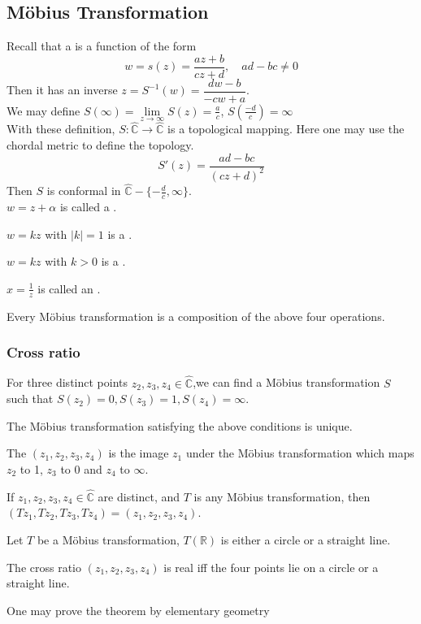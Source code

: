 \subsection{M{\"o}bius Transformation}
Recall that a  is a function of the form
\[w=s(z)=\frac{az+b}{cz+d},\quad ad-bc\not=0\]
Then it has an inverse  $ z=S^{-1}(w)=\dfrac{dw-b}{-cw+a} $.\\
We may define  $ S(\infty)=\lim\limits_{z\to \infty}S(z)=\frac{a }{c} $, $ S(\frac{-d }{c})=\infty $ \\
With these definition,  $ S:\hat{\mathbb{C}}\rightarrow\hat{\mathbb{C}} $ is a topological mapping. Here one may use the chordal metric to define the topology.\\
\[S'(z)=\frac{ad-bc}{(cz+d)^2}\]
Then  $ S  $ is conformal in  $ \hat{\mathbb{C}}-\{-\frac{d }{c},\infty\} $.\\
$ w=z+\alpha  $ is called a .

$ w=kz  $ with  $ |k|=1 $ is a .

$ w=kz $ with  $ k>0  $ is a .

$ x=\frac{1 }{z }  $ is called an .
\begin{proposition}
    Every M{\"o}bius transformation is a composition of the above four operations.
\end{proposition}    
\subsubsection{Cross ratio}
For three distinct points  $ z_2,z_3,z_4\in\hat{\mathbb{C}} $,we can find a M{\"o}bius transformation  $ S $ such that  $ S(z_2)=0,S(z_3)=1,S(z_4)=\infty $.
\begin{lemma}
    The M{\"o}bius transformation satisfying the above conditions is unique.
\end{lemma}
The  $ (z_1,z_2,z_3,z_4) $ is the image  $ z_1 $ under the M{\"o}bius transformation which maps  $ z_2  $ to 1, $ z_3  $ to 0 and $ z_4  $ to  $ \infty $.
\begin{theorem}
    If  $ z_1,z_2,z_3,z_4\in \hat{\mathbb{C}} $  are distinct, and  $ T  $ is any M{\"o}bius transformation, then $ (Tz_1,Tz_2,Tz_3,Tz_4)=(z_1,z_2,z_3,z_4) $. 
\end{theorem} 
\begin{lemma}
    Let  $ T  $ be a M{\"o}bius transformation,  $ T(\mathbb{R}) $ is either a circle or a straight line.
\end{lemma}  
\begin{theorem}
    The cross ratio  $ (z_1,z_2,z_3,z_4) $ is real iff the four points lie on a circle or a straight line.
\end{theorem}
\begin{remark}
    One may prove the theorem by elementary geometry
\end{remark}
